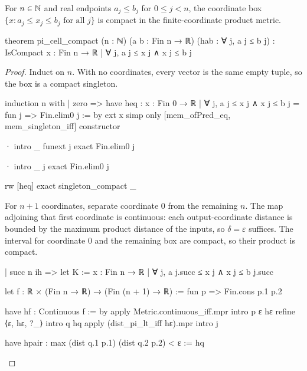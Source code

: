 \begin{lemma}
  \label{an1:lem:pi-cell-compact}
  For $n\in\mathbb{N}$ and real endpoints $a_j\leq b_j$ for $0\leq j<n$, the coordinate box $\{x: a_j\leq
    x_j\leq b_j\text{ for all }j\}$ is compact in the finite-coordinate product metric.

  \begin{lean}
    theorem pi_cell_compact (n : ℕ) (a b : Fin n → ℝ) (hab : ∀ j, a j ≤ b j) :
        IsCompact {x : Fin n → ℝ | ∀ j, a j ≤ x j ∧ x j ≤ b j}
  \end{lean}
\end{lemma}

\begin{proof}
  Induct on $n$.
  With no coordinates, every vector is the same empty tuple, so the box is a compact singleton.

  \begin{lean}
    induction n with
    | zero =>
      have heq : {x : Fin 0 → ℝ | ∀ j, a j ≤ x j ∧ x j ≤ b j} = {fun j => Fin.elim0 j} := by
        ext x
        simp only [mem_ofPred_eq, mem_singleton_iff]
        constructor

        · intro _
          funext j
          exact Fin.elim0 j

        · intro _ j
          exact Fin.elim0 j

      rw [heq]
      exact singleton_compact _
  \end{lean}

  For $n+1$ coordinates, separate coordinate $0$ from the remaining $n$.
  The map adjoining that first coordinate is continuous: each output-coordinate distance is bounded
  by the maximum product distance of the inputs, so $\delta=\varepsilon$ suffices.
  The interval for coordinate $0$ and the remaining box are compact, so their product is compact.

  \begin{lean}
    | succ n ih =>
      let K := {x : Fin n → ℝ | ∀ j, a j.succ ≤ x j ∧ x j ≤ b j.succ}

      let f : ℝ × (Fin n → ℝ) → (Fin (n + 1) → ℝ) := fun p => Fin.cons p.1 p.2

      have hf : Continuous f := by
        apply Metric.continuous_iff.mpr
        intro p ε hε
        refine ⟨ε, hε, ?_⟩
        intro q hq
        apply (dist_pi_lt_iff hε).mpr
        intro j

        have hpair : max (dist q.1 p.1) (dist q.2 p.2) < ε := hq


\end{lean}
\end{proof}
